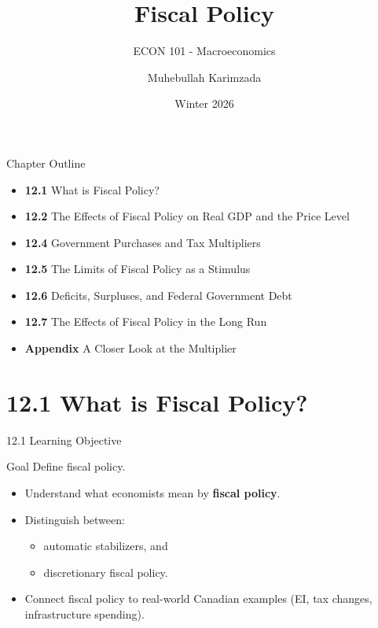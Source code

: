 \documentclass[aspectratio=169]{beamer}
\title{\textbf{Fiscal Policy \vspace{.5cm}\\  }}
\subtitle{ {\large ECON 101 - Macroeconomics}}
\author{Muhebullah Karimzada}
\date{Winter 2026}
\begin{document}
\begin{frame}[plain]
  \titlepage
\end{frame}

\begin{frame}{Chapter Outline}
\transfade
\begin{itemize}
  \item \textbf{12.1} What is Fiscal Policy?
  \item \textbf{12.2} The Effects of Fiscal Policy on Real GDP and the Price Level
  \item \textbf{12.4} Government Purchases and Tax Multipliers
  \item \textbf{12.5} The Limits of Fiscal Policy as a Stimulus
  \item \textbf{12.6} Deficits, Surpluses, and Federal Government Debt
  \item \textbf{12.7} The Effects of Fiscal Policy in the Long Run
  \item \textbf{Appendix} A Closer Look at the Multiplier
\end{itemize}
\end{frame}

\section{12.1 What is Fiscal Policy?}

\begin{frame}{12.1 Learning Objective}
\transfade
\begin{block}{Goal}
Define fiscal policy.
\end{block}
\begin{itemize}
  \item Understand what economists mean by \textbf{fiscal policy}.
  \item Distinguish between:
  \begin{itemize}
    \item automatic stabilizers, and
    \item discretionary fiscal policy.
  \end{itemize}
  \item Connect fiscal policy to real-world Canadian examples (EI, tax changes, infrastructure spending).
\end{itemize}
\end{frame}
\end{document}
